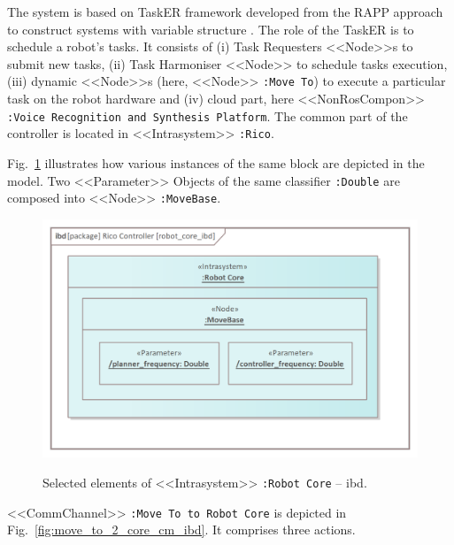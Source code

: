 \documentclass[11pt,oneside,a4paper]{article}
\begin{document}
	The system is based on TaskER framework \cite{tasker2020} developed from the RAPP approach to construct systems with variable structure \cite{zielinski2017variable}. The role of the TaskER is to schedule a robot’s tasks. It consists of (i) Task Requesters <<Node>>s to submit new tasks, (ii) Task Harmoniser <<Node>> to schedule tasks execution, (iii) dynamic <<Node>>s (here, <<Node>> \texttt{:Move To}) to execute a particular task on the robot hardware and (iv) cloud part, here <<NonRosCompon>> \texttt{:Voice Recognition and Synthesis Platform}. The common part of the controller is located in <<Intrasystem>> \texttt{:Rico}.
	
	\pagebreak
	
	Fig.~\ref{fig:robot_core_ibd} illustrates how various instances of the same block are depicted in the model. Two <<Parameter>> Objects of the same classifier \texttt{:Double} are composed into <<Node>> \texttt{:MoveBase}.
	
	\begin{figure}[H]
		\centering
		\begin{center}
			{\includegraphics[scale=1.0]{img/rico_pkg/robot_core_ibd.png}}
		\end{center}
		\caption{Selected elements of <<Intrasystem>> \texttt{:Robot Core} -- ibd.} 
		\label{fig:robot_core_ibd}
	\end{figure}
	
			
	<<CommChannel>> \texttt{:Move To to Robot Core} is depicted in Fig.~\ref{fig:move_to_2_core_cm_ibd}. It comprises three actions.
	
\end{document}
